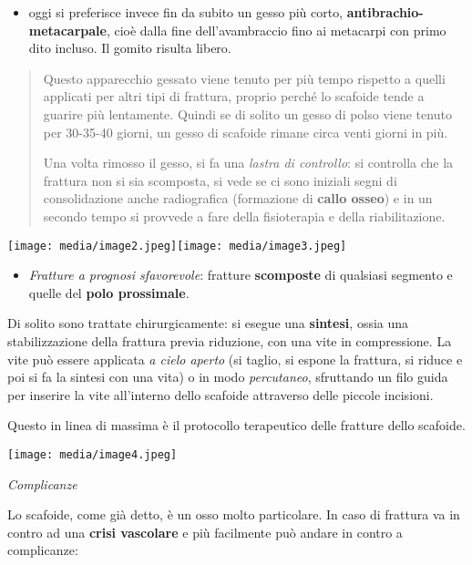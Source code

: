 \documentclass[]{article}
\begin{document}
\begin{itemize}
\item
  oggi si preferisce invece fin da subito un gesso più corto,
  \textbf{antibrachio-metacarpale}, cioè dalla fine dell'avambraccio
  fino ai metacarpi con primo dito incluso. Il gomito risulta libero.
\end{itemize}

\begin{quote}
Questo apparecchio gessato viene tenuto per più tempo rispetto a quelli
applicati per altri tipi di frattura, proprio perché lo scafoide tende a
guarire più lentamente. Quindi se di solito un gesso di polso viene
tenuto per 30-35-40 giorni, un gesso di scafoide rimane circa venti
giorni in più.

Una volta rimosso il gesso, si fa una \emph{lastra di controllo}: si
controlla che la frattura non si sia scomposta, si vede se ci sono
iniziali segni di consolidazione anche radiografica (formazione di
\textbf{callo osseo}) e in un secondo tempo si provvede a fare della
fisioterapia e della riabilitazione.
\end{quote}

\texttt{[image: media/image2.jpeg]}\texttt{[image: media/image3.jpeg]}

\begin{itemize}
\item
  \emph{Fratture a prognosi sfavorevole}: fratture \textbf{scomposte} di
  qualsiasi segmento e quelle del \textbf{polo prossimale}.
\end{itemize}

Di solito sono trattate chirurgicamente: si esegue una \textbf{sintesi},
ossia una stabilizzazione della frattura previa riduzione, con una vite
in compressione. La vite può essere applicata \emph{a cielo aperto} (si
taglio, si espone la frattura, si riduce e poi si fa la sintesi con una
vita) o in modo \emph{percutaneo}, sfruttando un filo guida per inserire
la vite all'interno dello scafoide attraverso delle piccole incisioni.

Questo in linea di massima è il protocollo terapeutico delle fratture
dello scafoide.

\texttt{[image: media/image4.jpeg]}

\emph{Complicanze}

Lo scafoide, come già detto, è un osso molto particolare. In caso di
frattura va in contro ad una \textbf{crisi vascolare} e più facilmente
può andare in contro a complicanze:
\end{document}
